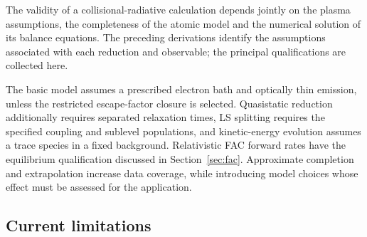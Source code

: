 \documentclass[11pt,a4paper]{article}
\numberwithin{equation}{section}
\begin{document}
The validity of a collisional-radiative calculation depends jointly
on the plasma assumptions, the completeness of the atomic model and
the numerical solution of its balance equations. The preceding
derivations identify the assumptions associated with each reduction
and observable; the principal qualifications are collected here.

The basic model assumes a prescribed electron bath and optically
thin emission, unless the restricted escape-factor closure is selected.
Quasistatic reduction additionally requires separated
relaxation times, LS splitting requires the specified coupling and
sublevel populations, and kinetic-energy evolution assumes a trace
species in a fixed background. Relativistic FAC forward rates have
the equilibrium qualification discussed in Section~\ref{sec:fac}.
Approximate completion and extrapolation increase data coverage,
while introducing model choices whose effect must be assessed for
the application.

\subsection{Current limitations}
\end{document}
